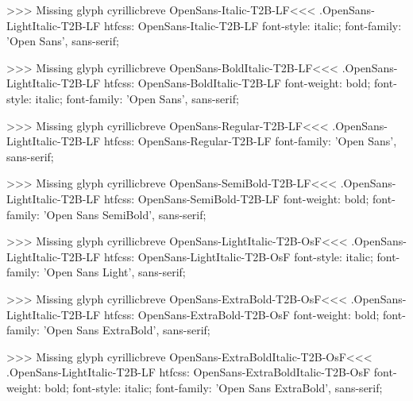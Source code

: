 >>>
Missing glyph	cyrillicbreve
\<OpenSans-Italic-T2B-LF\><<<
.OpenSans-LightItalic-T2B-LF
htfcss:  OpenSans-Italic-T2B-LF  font-style: italic; font-family: 'Open Sans', sans-serif;

>>>
Missing glyph	cyrillicbreve
\<OpenSans-BoldItalic-T2B-LF\><<<
.OpenSans-LightItalic-T2B-LF
htfcss:  OpenSans-BoldItalic-T2B-LF  font-weight: bold; font-style: italic; font-family: 'Open Sans', sans-serif;

>>>
Missing glyph	cyrillicbreve
\<OpenSans-Regular-T2B-LF\><<<
.OpenSans-LightItalic-T2B-LF
htfcss:  OpenSans-Regular-T2B-LF  font-family: 'Open Sans', sans-serif;

>>>
Missing glyph	cyrillicbreve
\<OpenSans-SemiBold-T2B-LF\><<<
.OpenSans-LightItalic-T2B-LF
htfcss:  OpenSans-SemiBold-T2B-LF  font-weight: bold; font-family: 'Open Sans SemiBold', sans-serif;

>>>
Missing glyph	cyrillicbreve
\<OpenSans-LightItalic-T2B-OsF\><<<
.OpenSans-LightItalic-T2B-LF
htfcss:  OpenSans-LightItalic-T2B-OsF  font-style: italic; font-family: 'Open Sans Light', sans-serif;

>>>
Missing glyph	cyrillicbreve
\<OpenSans-ExtraBold-T2B-OsF\><<<
.OpenSans-LightItalic-T2B-LF
htfcss:  OpenSans-ExtraBold-T2B-OsF  font-weight: bold; font-family: 'Open Sans ExtraBold', sans-serif;

>>>
Missing glyph	cyrillicbreve
\<OpenSans-ExtraBoldItalic-T2B-OsF\><<<
.OpenSans-LightItalic-T2B-LF
htfcss:  OpenSans-ExtraBoldItalic-T2B-OsF  font-weight: bold; font-style: italic; font-family: 'Open Sans ExtraBold', sans-serif;

